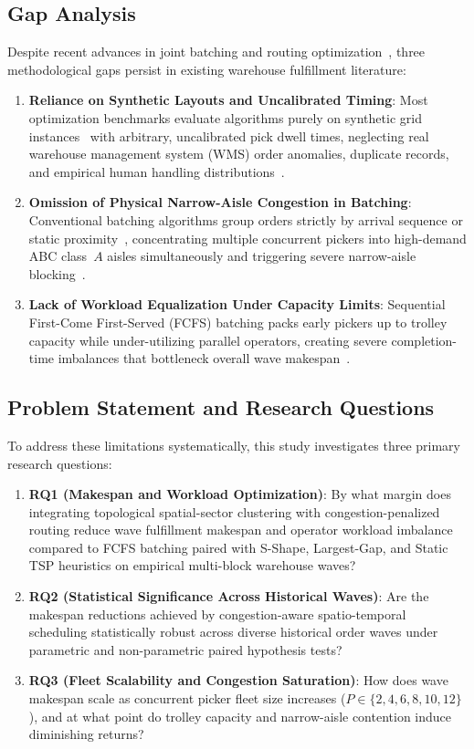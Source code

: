 \documentclass[conference]{IEEEtran}
\begin{document}
\subsection{Gap Analysis}
\label{sec:gap_analysis}
Despite recent advances in joint batching and routing optimization~\cite{tabrizi2023three,cao2023solving,briant2025solving}, three methodological gaps persist in existing warehouse fulfillment literature:
\begin{enumerate}
    \item \textbf{Reliance on Synthetic Layouts and Uncalibrated Timing}: Most optimization benchmarks evaluate algorithms purely on synthetic grid instances~\cite{barlang2026kit} with arbitrary, uncalibrated pick dwell times, neglecting real warehouse management system (WMS) order anomalies, duplicate records, and empirical human handling distributions~\cite{assis2025order,niemann2026dara}.
    \item \textbf{Omission of Physical Narrow-Aisle Congestion in Batching}: Conventional batching algorithms group orders strictly by arrival sequence or static proximity~\cite{gulyesil2024new,gorener2025picker}, concentrating multiple concurrent pickers into high-demand ABC class~$A$ aisles simultaneously and triggering severe narrow-aisle blocking~\cite{koreis2026side}.
    \item \textbf{Lack of Workload Equalization Under Capacity Limits}: Sequential First-Come First-Served (FCFS) batching packs early pickers up to trolley capacity while under-utilizing parallel operators, creating severe completion-time imbalances that bottleneck overall wave makespan~\cite{gabellini2024hybrid}.
\end{enumerate}

\subsection{Problem Statement and Research Questions}
\label{sec:rqs}
To address these limitations systematically, this study investigates three primary research questions:
\begin{enumerate}
    \item \textbf{RQ1 (Makespan and Workload Optimization)}: By what margin does integrating topological spatial-sector clustering with congestion-penalized routing reduce wave fulfillment makespan and operator workload imbalance compared to FCFS batching paired with S-Shape, Largest-Gap, and Static TSP heuristics on empirical multi-block warehouse waves?
    \item \textbf{RQ2 (Statistical Significance Across Historical Waves)}: Are the makespan reductions achieved by congestion-aware spatio-temporal scheduling statistically robust across diverse historical order waves under parametric and non-parametric paired hypothesis tests?
    \item \textbf{RQ3 (Fleet Scalability and Congestion Saturation)}: How does wave makespan scale as concurrent picker fleet size increases ($P \in \{2, 4, 6, 8, 10, 12\}$), and at what point do trolley capacity and narrow-aisle contention induce diminishing returns?
\end{enumerate}
\end{document}
